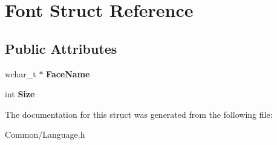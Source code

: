 \hypertarget{struct_font}{}\section{Font Struct Reference}
\label{struct_font}
\subsection*{Public Attributes}
\begin{DoxyCompactItemize}
\item 
\mbox{\label{struct_font_a6ac8b0074325c71e642b43119c8ec1e6}} 
wchar\+\_\+t $\ast$ {\bfseries Face\+Name}
\item 
\mbox{\label{struct_font_a3b56dc29dfa53361497d295bd6d3910c}} 
int {\bfseries Size}
\end{DoxyCompactItemize}


The documentation for this struct was generated from the following file\+:\begin{DoxyCompactItemize}
\item 
Common/Language.\+h\end{DoxyCompactItemize}
